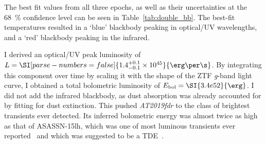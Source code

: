 The best fit values from all three epochs, as well as their uncertainties at the \SI{68}{\percent} confidence level can be seen in Table~\ref{tab:double_bb}. The best-fit temperatures resulted in a `blue' blackbody peaking in optical/UV wavelengths, and a `red' blackbody peaking in the infrared.

I derived an optical/UV peak luminosity of $L=\SI[parse-numbers = false]{1.4^{+0.1}_{-0.1}\times10^{45}}{\erg\per\s}$. By integrating this component over time by scaling it with the shape of the ZTF \textit{g}-band light curve, I obtained a total bolometric luminosity of $E_\text{bol} = \SI{3.4e52}{\erg}$. I did not add the infrared blackbody, as dust absorption was already accounted for by fitting for dust extinction. This pushed \emph{AT2019fdr} to the class of brightest transients ever detected. Its inferred bolometric energy was almost twice as high as that of ASASSN-15lh, which was one of most luminous transients ever reported~ and which was suggested to be a TDE~.

